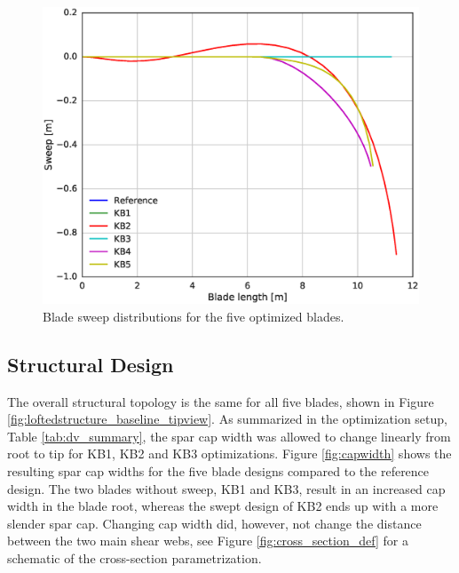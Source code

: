 \begin{figure}[pht]
\begin{center}
	\includegraphics[width=.85\linewidth]{figures/KBcomp_sweep.eps}
\end{center}
\caption{Blade sweep distributions for the five optimized blades.}
\label{fig:sweep}
\end{figure}

\subsection{Structural Design}

The overall structural topology is the same for all five blades, shown in Figure \ref{fig:loftedstructure_baseline_tipview}.
As summarized in the optimization setup, Table \ref{tab:dv_summary}, the spar cap width was allowed to change linearly from root to tip for KB1, KB2 and KB3 optimizations. Figure \ref{fig:capwidth} shows the resulting spar cap widths for the five blade designs compared to the reference design.
The two blades without sweep, KB1 and KB3, result in an increased cap width in the blade root, whereas the swept design of KB2 ends up with a more slender spar cap. Changing cap width did, however, not change the distance between the two main shear webs, see Figure \ref{fig:cross_section_def} for a schematic of the cross-section parametrization.

